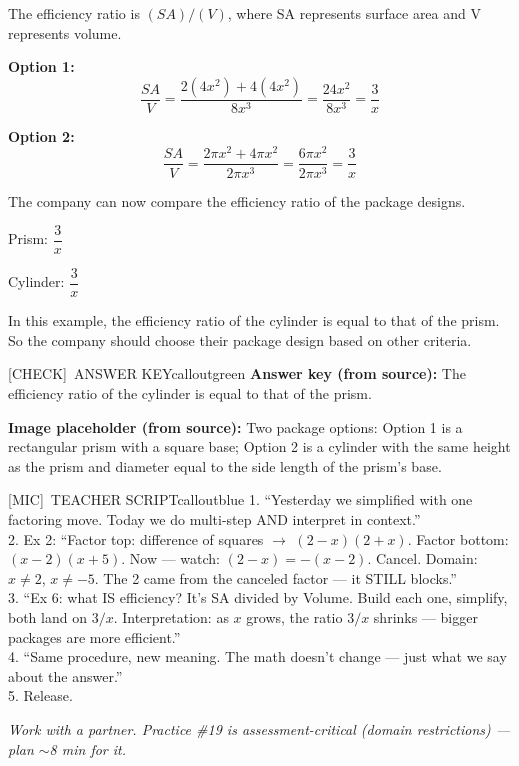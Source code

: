 \documentclass[11pt]{article}
\newcommand{\IconCheck}{[CHECK]}
\newcommand{\IconMic}{[MIC]}
\newcommand{\teacheranswerbox}[2]{%
  \begin{callout}{#1}{calloutgreen}
  #2
  \end{callout}
}
\begin{document}
{The efficiency ratio is \((SA)/(V)\), where SA represents surface area and V represents volume.

\textbf{Option 1:}
\[
\frac{SA}{V}
=
\frac{2(4x^2)+4(4x^2)}{8x^3}
=
\frac{24x^2}{8x^3}
=
\frac{3}{x}
\]

\textbf{Option 2:}
\[
\frac{SA}{V}
=
\frac{2\pi x^2+4\pi x^2}{2\pi x^3}
=
\frac{6\pi x^2}{2\pi x^3}
=
\frac{3}{x}
\]

The company can now compare the efficiency ratio of the package designs.

Prism: \(\dfrac{3}{x}\)

Cylinder: \(\dfrac{3}{x}\)

In this example, the efficiency ratio of the cylinder is equal to that of the prism. So the company should choose their package design based on other criteria.
}{}

\teacheranswerbox{\IconCheck\ ANSWER KEY}{%
\textbf{Answer key (from source):} The efficiency ratio of the cylinder is equal to that of the prism.

\textbf{Image placeholder (from source):} Two package options: Option 1 is a rectangular prism with a square base; Option 2 is a cylinder with the same height as the prism and diameter equal to the side length of the prism's base.
}

\begin{callout}{\IconMic\ TEACHER SCRIPT}{calloutblue}
1. ``Yesterday we simplified with one factoring move. Today we do multi-step AND interpret in context.''\\
2. Ex 2: ``Factor top: difference of squares \(\rightarrow\) \((2-x)(2+x)\). Factor bottom: \((x-2)(x+5)\). Now --- watch: \((2-x) = -(x-2)\). Cancel. Domain: \(x \ne 2\), \(x \ne -5\). The 2 came from the canceled factor --- it STILL blocks.''\\
3. ``Ex 6: what IS efficiency? It's SA divided by Volume. Build each one, simplify, both land on \(3/x\). Interpretation: as \(x\) grows, the ratio \(3/x\) shrinks --- bigger packages are more efficient.''\\
4. ``Same procedure, new meaning. The math doesn't change --- just what we say about the answer.''\\
5. Release.
\end{callout}

\textit{Work with a partner. Practice \#19 is assessment-critical (domain restrictions) --- plan \(\sim\)8 min for it.}
\end{document}
